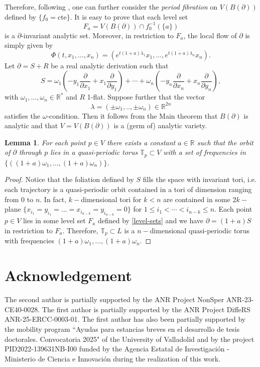 \documentclass[10pt,twoside,reqno]{amsart}
\newtheorem{lemma}[thm]{Lemma}
\theoremstyle{remark}
\theoremstyle{remark}
\newcommand{\R}{\mathbb{R}}
\begin{document}
Therefore, following \cite{Bruno1989}, one can further consider the {\em period fibration} on $V(B(\partial))$ defined by $\{f_0=\mathrm{cte}\}$. It is easy to prove that each level set 
\begin{equation}\label{level-sets}
F_a = V(B(\partial)) \cap f_0^{-1}(\{a\})
\end{equation}
is a $\partial$-invariant analytic set. Moreover, in restriction to $F_a$, the local flow of $\partial$ is simply given by
$$
\Phi(t,x_1,\ldots,x_n) = (e^{t(1+a)\lambda_1} x_1,\ldots, e^{t(1+a)\lambda_n} x_n).
$$
Let $\partial=S+R$ be a real analytic derivation such that
    $$S= \omega_1\left(-y_1 \frac{\partial}{\partial x_1} + x_1 \frac{\partial}{\partial y_1}\right)  + \cdots + \omega_n \left( -y_n \frac{\partial}{\partial x_n} + x_n \frac{\partial}{\partial y_n} \right), $$ 
    with $\omega_1,\ldots,\omega_n\in \R^\ast$ and $R$ 1-flat. Suppose further that the vector 
    $$\lambda = (\pm\omega_1,..,\pm \omega_n) \in \R^{2n}$$ satisfies the $\omega$-condition. 
    Then it follows from the Main theorem that $B(\partial)$ is analytic and that $V = V(B(\partial))$ is a (germ of) analytic variety.
    \begin{lemma}
   For each point $
    p\in V$ there exists a constant $a\in \R$ such that the orbit of $\partial$ through $p$ lies in a quasi-periodic torus $\mathbb{T}_p \subset V$ with a set of frequencies in $\{ ((1+a)\omega_1,\ldots,(1+a) \omega_n)\}$.
\end{lemma}
\begin{proof}
    Notice that the foliation defined by $S$ fills the space with invariant tori, i.e. each trajectory is a quasi-periodic orbit contained in a tori of dimension ranging from 0 to $n$. In fact, $k-$dimensional tori for $k<n$ are contained in some $2k-$plane $\{ x_{i_1}=y_{i_1}=\ldots= x_{i_{n-k}}=y_{i_{n-k}} =0  \}$ for $1\leq i_1< \cdots < i_{n-k}\leq n$.
 Each point $p \in V$ lies in some level set $F_a$ defined by \eqref{level-sets} and we have $\partial= (1+a)S$ in restriction to $F_a$. Therefore, $\mathbb{T}_p\subset L$ is a $n-$dimensional quasi-periodic torus with frequencies $(1+a)\omega_1,\ldots, (1+a)\omega_n$. 
\end{proof}




\section*{Acknowledgement}
The second author is partially supported by the ANR Project NonSper ANR-23-CE40-0028. The first author is partially supported by the ANR Project DiffeRS ANR-25-ERCC-0003-01. 
The first author has also been partially supported by the mobility program ``Ayudas para estancias breves en el desarrollo de tesis doctorales. Convocatoria 2025" of the University of Valladolid and by the project PID2022-139631NB-I00 funded by the Agencia Estatal de Investigación - Ministerio de Ciencia e Innovación during the realization of this work.
\end{document}
